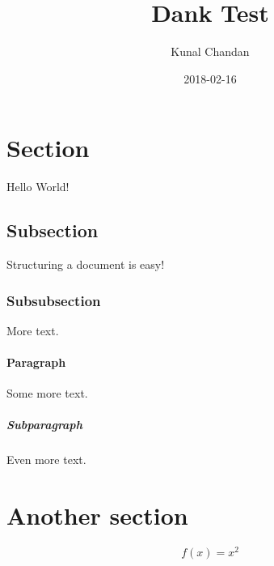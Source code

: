 \documentclass{article}
\title{Dank Test}
\date{2018-02-16}
\author{Kunal Chandan}
\begin{document}
\maketitle
{}
\newpage
{}

\section{Section}
Hello World!
\subsection{Subsection}
Structuring a document is easy!
\subsubsection{Subsubsection}
More text.
\paragraph{Paragraph}
Some more text.
\subparagraph{Subparagraph}
Even more text.
\section{Another section}


\begin{equation*}
  f(x) = x^2
\end{equation*}
\end{document}
